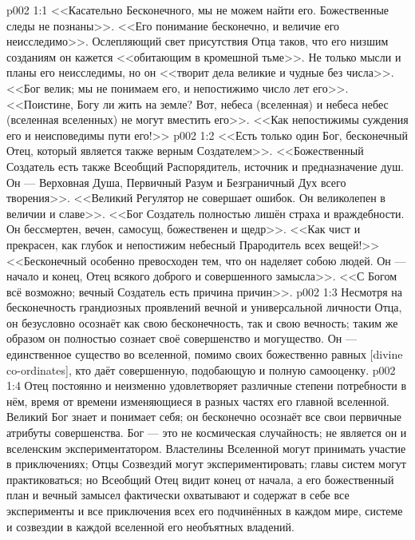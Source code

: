 \vs p002 1:1 <<Касательно Бесконечного, мы не можем найти его. Божественные следы не познаны>>. <<Его понимание бесконечно, и величие его неисследимо>>. Ослепляющий свет присутствия Отца таков, что его низшим созданиям он кажется <<обитающим в кромешной тьме>>. Не только мысли и планы его неисследимы, но он <<творит дела великие и чудные без числа>>. <<Бог велик; мы не понимаем его, и непостижимо число лет его>>. <<Поистине, Богу ли жить на земле? Вот, небеса (вселенная) и небеса небес (вселенная вселенных) не могут вместить его>>. <<Как непостижимы суждения его и неисповедимы пути его!>>
\vs p002 1:2 <<Есть только один Бог, бесконечный Отец, который является также верным Создателем>>. <<Божественный Создатель есть также Всеобщий Распорядитель, источник и предназначение душ. Он --- Верховная Душа, Первичный Разум и Безграничный Дух всего творения>>. <<Великий Регулятор не совершает ошибок. Он великолепен в величии и славе>>. <<Бог Создатель полностью лишён страха и враждебности. Он бессмертен, вечен, самосущ, божественен и щедр>>. <<Как чист и прекрасен, как глубок и непостижим небесный Прародитель всех вещей!>> <<Бесконечный особенно превосходен тем, что он наделяет собою людей. Он --- начало и конец, Отец всякого доброго и совершенного замысла>>. <<С Богом всё возможно; вечный Создатель есть причина причин>>.
\vs p002 1:3 \pc Несмотря на бесконечность грандиозных проявлений вечной и универсальной личности Отца, он безусловно осознаёт как свою бесконечность, так и свою вечность; таким же образом он полностью сознает своё совершенство и могущество. Он --- единственное существо во вселенной, помимо своих божественно равных [divine co\hyp{}ordinates], кто даёт совершенную, подобающую и полную самооценку.
\vs p002 1:4 Отец постоянно и неизменно удовлетворяет различные степени потребности в нём, время от времени изменяющиеся в разных частях его главной вселенной. Великий Бог знает и понимает себя; он бесконечно осознаёт все свои первичные атрибуты совершенства. Бог --- это не космическая случайность; не является он и вселенским экспериментатором. Властелины Вселенной могут принимать участие в приключениях; Отцы Созвездий могут экспериментировать; главы систем могут практиковаться; но Всеобщий Отец видит конец от начала, а его божественный план и вечный замысел фактически охватывают и содержат в себе все эксперименты и все приключения всех его подчинённых в каждом мире, системе и созвездии в каждой вселенной его необъятных владений.
